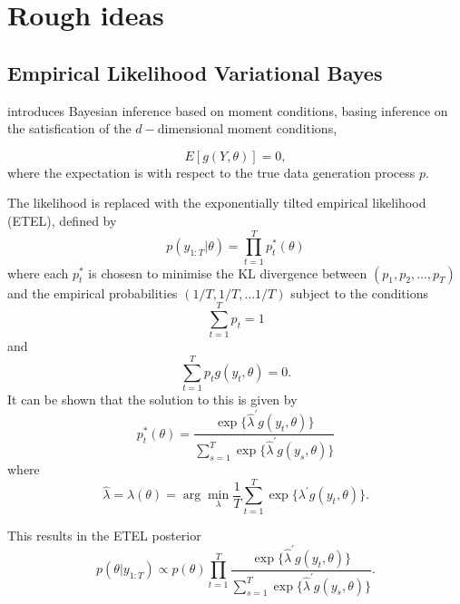 \documentclass[
12pt, %
onehalfspacing, %
nohyperref, %
headsepline, %
chapterinoneline, %
]{MastersDoctoralThesis} %
\begin{document}
\chapter{Rough ideas}

\section{Empirical Likelihood Variational Bayes}

\citet{Chib2017} introduces Bayesian inference based on moment conditions, basing inference on the satisfication of the $d-$dimensional moment conditions,

\begin{equation}
\label{emp:moments}
E \left[ g(Y, \theta) \right] = 0,
\end{equation}
where the expectation is with respect to the true data generation process $p$.

The likelihood is replaced with the exponentially tilted empirical likelihood (ETEL), defined by
\begin{equation}
\label{emp:etel}
p(y_{1:T} | \theta) = \prod_{t=1}^T p^*_t(\theta)
\end{equation}
where each $p^*_t$ is chosesn to minimise the KL divergence between $(p_1, p_2, \ldots, p_T)$ and the empirical probabilities $(1/T, 1/T, \ldots 1/T)$ subject to the conditions
\begin{equation}
\label{emp:sumRestrict}
\sum_{t=1}^T p_t = 1
\end{equation}
and
\begin{equation}
\label{emp:momentRestrict}
\sum_{t=1}^T p_t g(y_t, \theta) = 0.
\end{equation}
It can be shown that the solution to this is given by
\begin{equation}
\label{emp:solnP}
p^*_t(\theta) = \frac{\exp \{\hat{\lambda}^{\prime} g(y_t, \theta) \}}{ \sum_{s=1}^T \exp \{\hat{\lambda}^{\prime} g(y_s, \theta) \}}
\end{equation}
where
\begin{equation}
\label{emp:solnLambda}
\hat{\lambda} = \lambda(\theta) = \arg \underset{\lambda}{\min} \frac{1}{T} \sum_{t=1}^T \exp \{\lambda^{\prime} g(y_t, \theta) \}.
\end{equation}

This results in the ETEL posterior
\begin{equation}
\label{emp:post}
p(\theta | y_{1:T}) \propto p(\theta) \prod_{t=1}^T\frac{\exp \{\hat{\lambda}^{\prime} g(y_t, \theta) \}}{ \sum_{s=1}^T \exp \{\hat{\lambda}^{\prime} g(y_s, \theta) \}}.
\end{equation}
\end{document}
